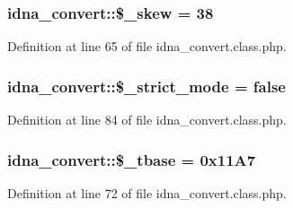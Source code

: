 \subsubsection[{\texorpdfstring{\$\+\_\+skew}{$_skew}}]{\setlength{\rightskip}{0pt plus 5cm}idna\+\_\+convert\+::\$\+\_\+skew = 38\hspace{0.3cm}{\ttfamily [protected]}}\hypertarget{classidna__convert_ae444bd5e85604ec097705a95ab21f144}{}\label{classidna__convert_ae444bd5e85604ec097705a95ab21f144}


Definition at line 65 of file idna\+\_\+convert.\+class.\+php.

\subsubsection[{\texorpdfstring{\$\+\_\+strict\+\_\+mode}{$_strict_mode}}]{\setlength{\rightskip}{0pt plus 5cm}idna\+\_\+convert\+::\$\+\_\+strict\+\_\+mode = false\hspace{0.3cm}{\ttfamily [protected]}}\hypertarget{classidna__convert_a6457ade57cb55c7b44bfbf8686c2c2d5}{}\label{classidna__convert_a6457ade57cb55c7b44bfbf8686c2c2d5}


Definition at line 84 of file idna\+\_\+convert.\+class.\+php.

\subsubsection[{\texorpdfstring{\$\+\_\+tbase}{$_tbase}}]{\setlength{\rightskip}{0pt plus 5cm}idna\+\_\+convert\+::\$\+\_\+tbase = 0x11\+A7\hspace{0.3cm}{\ttfamily [protected]}}\hypertarget{classidna__convert_a5b728e6ff6e15773c914383a66651826}{}\label{classidna__convert_a5b728e6ff6e15773c914383a66651826}


Definition at line 72 of file idna\+\_\+convert.\+class.\+php.

